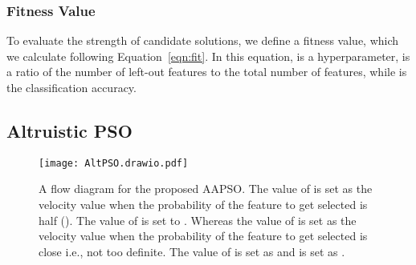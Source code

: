 \documentclass[final,3p,times]{elsarticle}
\begin{document}
\subsubsection{Fitness Value}

To evaluate the strength of candidate solutions, we define a fitness value,{ which we calculate} following Equation~\ref{eqn:fit}. In this equation,  is a hyperparameter,  is a ratio of the number of left-out features to the total number of {features,} while  is the classification accuracy. \subsection{Altruistic PSO}
\begin{figure}[ht!]
    \centering
    \texttt{[image: AltPSO.drawio.pdf]}
    \caption{A flow diagram for the proposed AAPSO. The value of  is set as the velocity value when the probability of the feature to get selected is half (). The value of  is set to . Whereas the value of  is set as the velocity value when the probability of the feature to get selected is close  i.e., not too definite. The value of  is set as  and  is set as .}
    \label{fig:altpso}
\end{figure}
\end{document}
